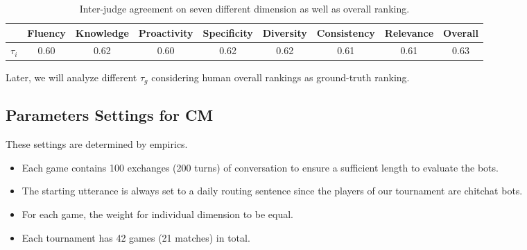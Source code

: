\begin{table}[ht!]
\centering
\small
\begin{tabular}{lcccccccc}
\toprule
& Fluency& Knowledge& Proactivity& Specificity& Diversity& Consistency & Relevance & Overall \\ \midrule
$\tau_i$ & 0.60 &0.62 & 0.60&0.62 &0.62 &0.61 &0.61 & 0.63  \\
\bottomrule
\end{tabular}
\caption{Inter-judge agreement on seven different dimension as well as overall ranking.}
\label{tab:inter}
\end{table}
 
Later, we will analyze different $\tau_g$ 
considering human overall rankings as ground-truth ranking.  


\subsection{Parameters Settings for CM}
These settings are determined by empirics.
\begin{itemize}
\item  Each game contains 100 exchanges (200 turns) of conversation
to ensure a sufficient length to evaluate the bots.
\item  The starting utterance is always set to
a daily routing sentence
since the players of our tournament are chitchat bots.
\item For each game, the weight for individual dimension to be equal. 
\item Each tournament has 42 games (21 matches) 
in total. 
\end{itemize}


